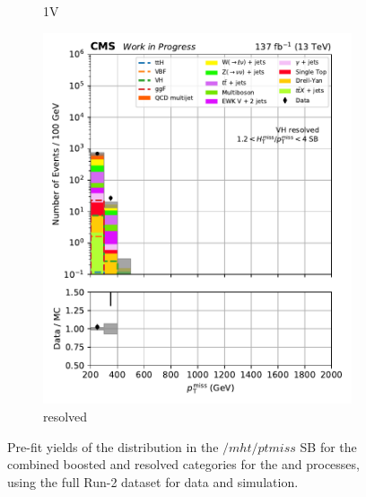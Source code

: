 \begin{figure}[htbp]
\begin{subfigure}[b]{0.24\textwidth}
        \caption{\VH 1V}
    \end{subfigure}
    \hfill
    \begin{subfigure}[b]{0.24\textwidth}
        \includegraphics[width=\textwidth]{figures/region_plots/2016to18/sideband_2/VH_resolved.pdf}
        \caption{\VH resolved}
    \end{subfigure}
    \caption[Pre-fit yields of the \ptmiss distribution in the $/mht/ptmiss$ sideband for the combined boosted and resolved categories for the \ttH and \VH processes, using the full Run-2 dataset for data and simulation]{Pre-fit yields of the \ptmiss distribution in the $/mht/ptmiss$ \gls{SB} for the combined boosted and resolved categories for the \ttH and \VH processes, using the full Run-2 dataset for data and simulation.}
    \label{fig:htoinv_sb_yields_comb2016to18_mht_met}
\end{figure}

